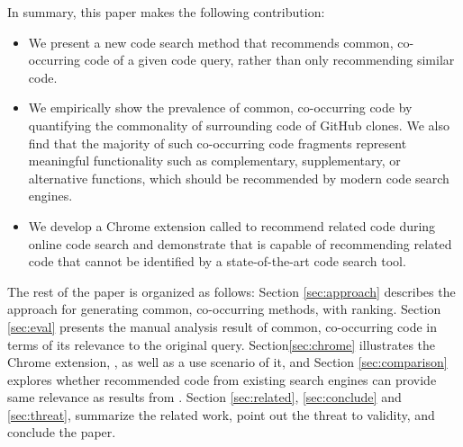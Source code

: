 In summary, this paper makes the following contribution:
\begin{itemize}
\item We present a new code search method that recommends common, co-occurring code of a given code query, rather than only recommending similar code.
\item We empirically show the prevalence of common, co-occurring code by quantifying the commonality of surrounding code of GitHub clones. We also find that the majority of such co-occurring code fragments represent meaningful functionality such as complementary, supplementary, or alternative functions, which should be recommended by modern code search engines.
\item We develop a Chrome extension called {\tool} to recommend related code during online code search and demonstrate that {\tool} is capable of recommending related code that cannot be identified by a state-of-the-art code search tool.
\end{itemize}

The rest of the paper is organized as follows: Section
\ref{sec:approach} describes the approach for generating
common, co-occurring methods, with ranking. Section \ref{sec:eval} presents the manual analysis result of common, co-occurring code in terms of its relevance to the original query. Section\ref{sec:chrome} illustrates the Chrome extension, {\tool}, as well as a use scenario of it, and Section \ref{sec:comparison} explores whether recommended code from existing search engines can provide same relevance as results from {\tool}. Section \ref{sec:related}, \ref{sec:conclude} and \ref{sec:threat}, summarize the related work, point out the threat to validity, and conclude the paper.
